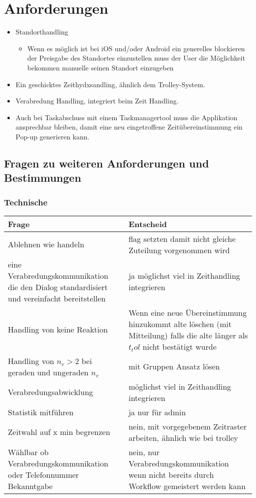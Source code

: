 
\chapter{Anforderungen}

\begin{itemize}
\item Standorthandling
\begin{itemize}
\item Wenn es möglich ist bei iOS und/oder Android ein generelles blockieren der Preisgabe des Standortes einzustellen muss der User die Möglichkeit bekommen manuelle seinen Standort einzugeben
\end{itemize}
\item Ein geschicktes Zeithydxsandling, ähnlich dem Trolley-System.
\item Verabredung Handling, integriert beim Zeit Handling.
\item Auch bei Taskabschuss mit einem Taskmanagertool muss die Applikation ansprechbar bleiben, damit eine neu eingetroffene Zeitübereinstimmung ein Pop-up generieren kann.
\end{itemize}




\section{Fragen zu weiteren Anforderungen und Bestimmungen}

\subsection{Technische}
\begin{tabularx}{\textwidth}{X|X}
Frage & Entscheid \\\hline
Ablehnen wie handeln & flag setzten damit nicht gleiche Zuteilung vorgenommen wird\\\hline
eine Verabredungskommunikation die den Dialog standardisiert und vereinfacht bereitstellen & ja möglichst viel in Zeithandling integrieren\\\hline
Handling von keine Reaktion & Wenn eine neue Übereinstimmung hinzukommt alte löschen (mit Mitteilung) falls die alte länger als $t_tol$ nicht bestätigt wurde\\\hline
Handling von $n_v>2$ bei geraden und ungeraden $n_v$ & mit Gruppen Ansatz lösen \\\hline
Verabredungsabwicklung & möglichst viel in Zeithandling integrieren\\\hline
Statistik mitführen & ja nur für admin\\\hline
Zeitwahl auf x min begrenzen & nein, mit vorgegebenem Zeitraster arbeiten, ähnlich wie bei trolley\\\hline
Wählbar ob Verabredungskommunikation oder Telefonnummer Bekanntgabe & nein, nur Verabredungskommunikation wenn nicht bereits durch Workflow gemeistert werden kann\\
\end{tabularx}


